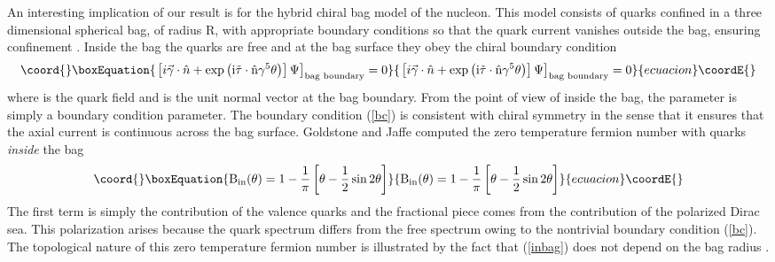 \documentclass[a4paper,prd,showpacs,showkeys]{revtex4}
\begin{document}
{{An interesting implication of our result is for the \coordHE{} hybrid chiral bag model of the nucleon. This model consists of quarks confined in a three dimensional spherical bag, of radius R, with appropriate boundary conditions so that the quark current vanishes outside the bag, ensuring confinement \cite{jaffe,bhaduri}. Inside the bag the quarks are free and at the bag surface they obey the chiral boundary condition
\begin{equation}\coord{}\boxEquation{
\left. \left[i \vec{\gamma} \cdot \hat{n} + \rm{exp}\left(i \vec{\tau}\cdot \hat{n} \gamma^{5} \theta \right)\right] \Psi\right]_{\rm bag\,\, boundary}=0
\label{bc}
}{
\left. \left[i \vec{\gamma} \cdot \hat{n} + \rm{exp}\left(i \vec{\tau}\cdot \hat{n} \gamma^{5} \theta \right)\right] \Psi\right]_{\rm bag\,\, boundary}=0
}{ecuacion}\coordE{}\end{equation}
where \myHighlight{$\Psi$}\coordHE{} is the quark field and \coordHE{} is the unit normal vector at the bag boundary. From the point of view of inside the bag, the parameter \myHighlight{$\theta$}\coordHE{} is simply a boundary condition parameter. The boundary condition (\ref{bc})  is consistent with chiral symmetry in the sense that it ensures that the axial current is continuous across the bag surface. Goldstone and Jaffe computed the zero temperature fermion  number with \coordHE{} quarks {\it inside} the bag \cite{jaffe}
\begin{equation}\coord{}\boxEquation{
\textrm{B}_{\rm{in}}(\theta)=1- \frac{1}{\pi}\left[ \theta-\frac{1}{2} \sin 2 \theta\right]
\label{inbag}
}{
\textrm{B}_{\rm{in}}(\theta)=1- \frac{1}{\pi}\left[ \theta-\frac{1}{2} \sin 2 \theta\right]
}{ecuacion}\coordE{}\end{equation}
The first term is simply the contribution of the valence quarks and the fractional piece comes from the contribution of the polarized Dirac sea. This polarization arises because the quark spectrum differs from the free spectrum owing to the nontrivial boundary condition (\ref{bc}). The topological nature of this zero temperature fermion number is illustrated by the fact that (\ref{inbag}) does not depend on the bag radius \coordHE{}.

}}
\end{document}
